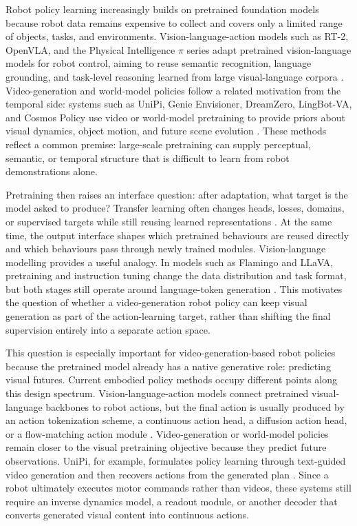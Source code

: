 Robot policy learning increasingly builds on pretrained foundation models because robot data remains expensive to collect and covers only a limited range of objects, tasks, and environments. Vision-language-action models such as RT-2, OpenVLA, and the Physical Intelligence $\pi$ series adapt pretrained vision-language models for robot control, aiming to reuse semantic recognition, language grounding, and task-level reasoning learned from large visual-language corpora \parencite{brohan2023rt2,kim2024openvla,black2024pi0,black2025pi05}. Video-generation and world-model policies follow a related motivation from the temporal side: systems such as UniPi, Genie Envisioner, DreamZero, LingBot-VA, and Cosmos Policy use video or world-model pretraining to provide priors about visual dynamics, object motion, and future scene evolution \parencite{du2023unipi,liao2025genieenvisioner,ye2026dreamzero,li2026lingbotva,kim2026cosmospolicy}. These methods reflect a common premise: large-scale pretraining can supply perceptual, semantic, or temporal structure that is difficult to learn from robot demonstrations alone.

Pretraining then raises an interface question: after adaptation, what target is the model asked to produce? Transfer learning often changes heads, losses, domains, or supervised targets while still reusing learned representations \parencite{pan2010survey}. At the same time, the output interface shapes which pretrained behaviours are reused directly and which behaviours pass through newly trained modules. Vision-language modelling provides a useful analogy. In models such as Flamingo and LLaVA, pretraining and instruction tuning change the data distribution and task format, but both stages still operate around language-token generation \parencite{alayrac2022flamingo,liu2023llava}. This motivates the question of whether a video-generation robot policy can keep visual generation as part of the action-learning target, rather than shifting the final supervision entirely into a separate action space.

This question is especially important for video-generation-based robot policies because the pretrained model already has a native generative role: predicting visual futures. Current embodied policy methods occupy different points along this design spectrum. Vision-language-action models connect pretrained visual-language backbones to robot actions, but the final action is usually produced by an action tokenization scheme, a continuous action head, a diffusion action head, or a flow-matching action module \parencite{brohan2023rt2,kim2024openvla,black2024pi0,black2025pi05}. Video-generation or world-model policies remain closer to the visual pretraining objective because they predict future observations. UniPi, for example, formulates policy learning through text-guided video generation and then recovers actions from the generated plan \parencite{du2023unipi}. Since a robot ultimately executes motor commands rather than videos, these systems still require an inverse dynamics model, a readout module, or another decoder that converts generated visual content into continuous actions.

